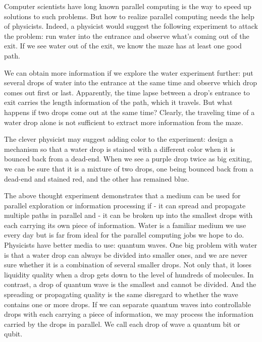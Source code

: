 \documentclass[oneside, letter, 12pt]{book}
\begin{document}
Computer scientists have long known parallel computing is the way to speed up solutions to such problems. But how to realize parallel computing needs the help of physicists. Indeed, a physicist would suggest the following experiment to attack the problem: run water into the entrance and observe what's coming out of the exit. If we see water out of the exit, we know the maze has at least one good path.

We can obtain more information if we explore the water experiment further: put several drops of water into the entrance at the same time and observe which drop comes out first or last. Apparently, the time lapse between a drop's entrance to exit carries the length information of the path, which it travels. But what happens if two drops come out at the same time? Clearly, the traveling time of a water drop alone is not sufficient to extract more information from the maze.

The clever physicist may suggest adding color to the experiment: design a mechanism so that a water drop is stained with a different color when it is bounced back from a dead-end. When we see a purple drop twice as big exiting, we can be sure that it is a mixture of two drops, one being bounced back from a dead-end and stained red, and the other has remained blue.

The above thought experiment demonstrates that a medium can be used for parallel exploration or information processing if
- it can spread and propagate multiple paths in parallel and
- it can be broken up into the smallest drops with each carrying its own piece of information.
Water is a familiar medium we use every day but is far from ideal for the parallel computing jobs we hope to do. Physicists have better media to use: quantum waves. One big problem with water is that a water drop can always be divided into smaller ones, and we are never sure whether it is a combination of several smaller drops. Not only that, it loses liquidity quality when a drop gets down to the level of hundreds of molecules. In contrast, a drop of quantum wave is the smallest and cannot be divided. And the spreading or propagating quality is the same disregard to whether the wave contains one or more drops. If we can separate quantum waves into controllable drops with each carrying a piece of information, we may process the information carried by the drops in parallel. We call each drop of wave a quantum bit or qubit.
\end{document}
